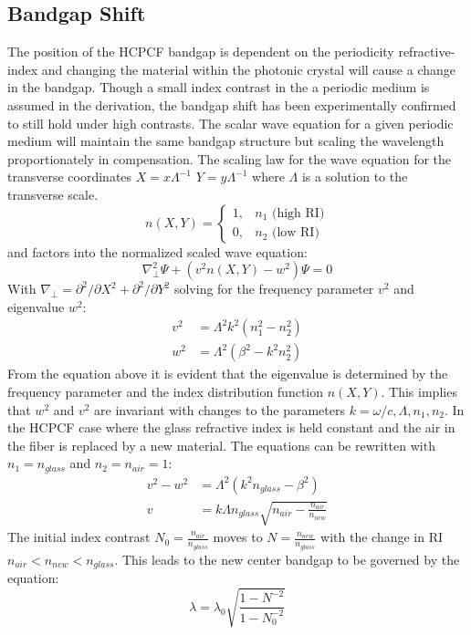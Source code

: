 \subsection{Bandgap Shift}
The position of the HCPCF bandgap is dependent on the periodicity refractive-index and changing the material within the photonic crystal will cause a change in the bandgap. Though a small index contrast in the a periodic medium is assumed in the derivation, the bandgap shift has been experimentally confirmed to still hold under high contrasts\cite{antonopoulos}. The scalar wave equation for a given periodic medium will maintain the same bandgap structure but scaling the wavelength proportionately in compensation\cite{birks}. The scaling law for the wave equation for the transverse coordinates
$X=x\Lambda^{-1}$ $Y=y\Lambda^{-1}$
where $\Lambda$ is a solution to the transverse scale.
\begin{equation}
	n(X, Y) = \begin{cases}
		1, & n_1 \text{   (high RI)} \\
		0, & n_2 \text{   (low RI)}
	\end{cases}
\end{equation}
and factors into the normalized scaled wave equation:
\begin{equation}
	\nabla_\perp^2\Psi + (v^2n(X, Y) - w^2)\Psi = 0
\end{equation}
With $\nabla_\perp = \partial^2/\partial X^2 + \partial^2/\partial Y^2 $
solving for the frequency parameter $v^2$ and eigenvalue $w^2$:
\begin{equation}
	\begin{aligned}
		v^2 & = \Lambda^2k^2(n_1^2 - n_2^2)   \\
		w^2 & = \Lambda^2(\beta^2 - k^2n_2^2)
	\end{aligned}
\end{equation}
From the equation above it is evident that the eigenvalue is determined by the frequency parameter and the index distribution function $n(X, Y)$. This implies that $w^2$ and $v^2$ are invariant with changes to the parameters $k = \omega/c, \Lambda, n_1, n_2$.
In the HCPCF case where the glass refractive index is held constant and the air in the fiber is replaced by a new material. The equations can be rewritten with $n_1 = n_{glass}$ and $n_2 = n_{air}=1$:
\begin{equation}
	\begin{aligned}
		v^2 - w^2 & = \Lambda^2(k^2n_{glass} - \beta^2)                          \\
		v         & = k\Lambda n_{glass}\sqrt{n_{air} - \frac{n_{air}}{n_{new}}}
	\end{aligned}
\end{equation}
The initial index contrast $N_0 = \frac{n_{air}}{n_{glass}}$ moves to $ N = \frac{n_{new}}{n_{glass}}$ with the change in RI $n_{air} <  n_{new} < n_{glass}$. This leads to the new center bandgap to be governed by the equation:
\begin{equation}
	\lambda = \lambda_0\sqrt{\frac{1-N^{-2}}{1-N_0^{-2}}}
\end{equation}





